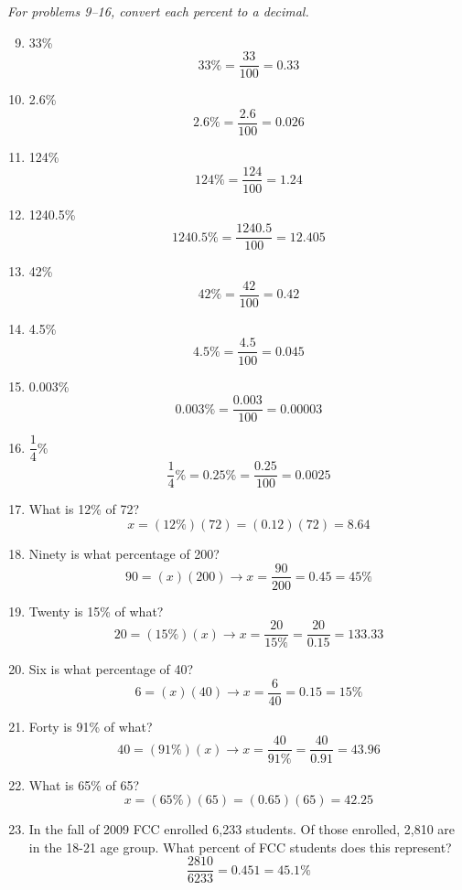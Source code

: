 \emph{For problems 9--16, convert each percent to a decimal.}
\begin{enumerate}
\setcounter{enumi}{8}
\item 33\% 
\[33\% = \dfrac{33}{100} = 0.33\]

\item 2.6\% 
\[2.6\% = \dfrac{2.6}{100} = 0.026\]

\item 124\% 
\[124\% = \dfrac{124}{100} = 1.24\]

\item 1240.5\% 
\[1240.5\% = \dfrac{1240.5}{100} = 12.405\]

\item 42\% 
\[42\% = \dfrac{42}{100} = 0.42\]

\item 4.5\% 
\[4.5\% = \dfrac{4.5}{100} = 0.045\]

\item 0.003\% 
\[0.003\% = \dfrac{0.003}{100} = 0.00003\]

\item $\dfrac{1}{4}\%$ 
\[\dfrac{1}{4}\% = 0.25\% = \dfrac{0.25}{100} = 0.0025\]

\item What is 12\% of 72? 
\[x = (12\%)(72) = (0.12)(72) = 8.64\]

\item Ninety is what percentage of 200? 
\[90 = (x)(200) \longrightarrow x = \dfrac{90}{200} = 0.45 = 45\%\]

\item Twenty is 15\% of what? 
\[20 = (15\%)(x) \longrightarrow x = \dfrac{20}{15\%} = \dfrac{20}{0.15} = 133.33\]

\item Six is what percentage of 40? 
\[6 = (x)(40) \longrightarrow x = \dfrac{6}{40} = 0.15 = 15\%\]

\item Forty is 91\% of what? 
\[40 = (91\%)(x) \longrightarrow x = \dfrac{40}{91\%} = \dfrac{40}{0.91} = 43.96\]

\item What is 65\% of 65? 
\[x = (65\%)(65) = (0.65)(65) = 42.25\]

\item In the fall of 2009 FCC enrolled 6,233 students.  Of those enrolled, 2,810 are in the 18-21 age group.  What percent of FCC students does this represent? 
\[\dfrac{2810}{6233} = 0.451 = 45.1\%\]


\end{enumerate}
